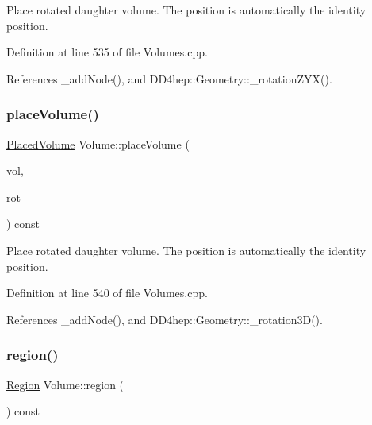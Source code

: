 Place rotated daughter volume. The position is automatically the identity position. 



Definition at line 535 of file Volumes.\+cpp.



References \+\_\+add\+Node(), and D\+D4hep\+::\+Geometry\+::\+\_\+rotation\+Z\+Y\+X().

\hypertarget{class_d_d4hep_1_1_geometry_1_1_volume_ae76792f42c90e5821c7cd3e2b2d70f0e}{}\label{class_d_d4hep_1_1_geometry_1_1_volume_ae76792f42c90e5821c7cd3e2b2d70f0e} 
\subsubsection{\texorpdfstring{place\+Volume()}{placeVolume()}\hspace{0.1cm}{\footnotesize\ttfamily [5/5]}}
{\footnotesize\ttfamily \hyperlink{class_d_d4hep_1_1_geometry_1_1_placed_volume}{Placed\+Volume} Volume\+::place\+Volume (\begin{DoxyParamCaption}\item[{const \hyperlink{class_d_d4hep_1_1_geometry_1_1_volume}{Volume} \&}]{vol,  }\item[{const \hyperlink{namespace_d_d4hep_1_1_geometry_a022fecb763315fa2bf39cbb648944a0e}{Rotation3D} \&}]{rot }\end{DoxyParamCaption}) const}



Place rotated daughter volume. The position is automatically the identity position. 



Definition at line 540 of file Volumes.\+cpp.



References \+\_\+add\+Node(), and D\+D4hep\+::\+Geometry\+::\+\_\+rotation3\+D().

\hypertarget{class_d_d4hep_1_1_geometry_1_1_volume_a5fda2a86ec792e7fe38d7e63b0c939e8}{}\label{class_d_d4hep_1_1_geometry_1_1_volume_a5fda2a86ec792e7fe38d7e63b0c939e8} 
\subsubsection{\texorpdfstring{region()}{region()}}
{\footnotesize\ttfamily \hyperlink{class_d_d4hep_1_1_geometry_1_1_region}{Region} Volume\+::region (\begin{DoxyParamCaption}{ }\end{DoxyParamCaption}) const}



